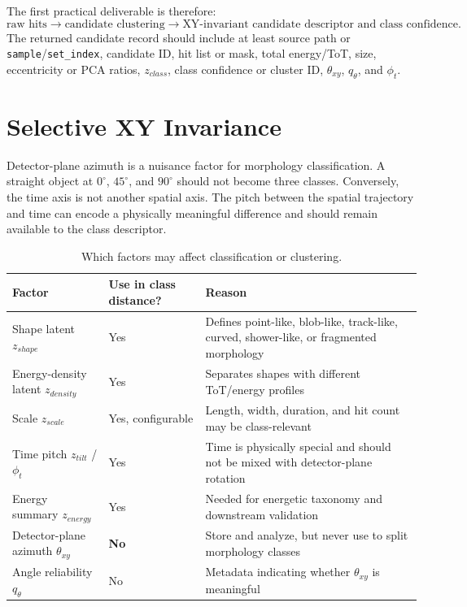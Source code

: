 \documentclass[11pt,a4paper]{article}
\newcommand{\code}[1]{\texttt{#1}}
\newcommand{\thetaxy}{\theta_{xy}}
\newcommand{\phit}{\phi_t}
\begin{document}
The first practical deliverable is therefore:
\[
\text{raw hits} \rightarrow \text{candidate clustering} \rightarrow \text{XY-invariant candidate descriptor and class confidence}.
\]
The returned candidate record should include at least source path or \code{sample}/\code{set\_index}, candidate ID, hit list or mask, total energy/ToT, size, eccentricity or PCA ratios, $z_{class}$, class confidence or cluster ID, $\thetaxy$, $q_\theta$, and $\phit$.

\section{Selective XY Invariance}

Detector-plane azimuth is a nuisance factor for morphology classification. A straight object at $0^\circ$, $45^\circ$, and $90^\circ$ should not become three classes. Conversely, the time axis is not another spatial axis. The pitch between the spatial trajectory and time can encode a physically meaningful difference and should remain available to the class descriptor.

\begin{table}[H]
\centering
\caption{Which factors may affect classification or clustering.}
\label{tab:factors}
\begin{tabularx}{\textwidth}{@{}L{0.30\textwidth}L{0.20\textwidth}Y@{}}
\toprule
\textbf{Factor} & \textbf{Use in class distance?} & \textbf{Reason} \\
\midrule
Shape latent $z_{shape}$ & Yes & Defines point-like, blob-like, track-like, curved, shower-like, or fragmented morphology \\
Energy-density latent $z_{density}$ & Yes & Separates shapes with different ToT/energy profiles \\
Scale $z_{scale}$ & Yes, configurable & Length, width, duration, and hit count may be class-relevant \\
Time pitch $z_{tilt}$ / $\phit$ & Yes & Time is physically special and should not be mixed with detector-plane rotation \\
Energy summary $z_{energy}$ & Yes & Needed for energetic taxonomy and downstream validation \\
Detector-plane azimuth $\thetaxy$ & \textbf{No} & Store and analyze, but never use to split morphology classes \\
Angle reliability $q_\theta$ & No & Metadata indicating whether $\thetaxy$ is meaningful \\
\bottomrule
\end{tabularx}
\end{table}
\end{document}
